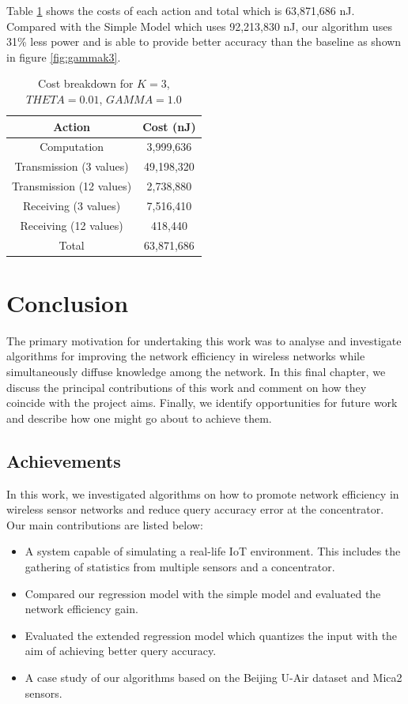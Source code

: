 \documentclass{mproj}
\begin{document}
Table \ref{table:costbreakdown} shows the costs of each action and total which is 63,871,686 nJ. Compared with the Simple Model which uses 92,213,830 nJ, our algorithm uses 31\% less power and is able to provide better accuracy than the baseline as shown in figure \ref{fig:gammak3}.

\begin{table}[!ht]
 \centering
 \begin{tabular}{|| c | c ||}
 \hline
 Action & Cost (nJ)\\
 \hline\hline
 Computation & 3,999,636 \\ 
 \hline
 Transmission (3 values) & 49,198,320 \\
 \hline
 Transmission (12 values) & 2,738,880 \\
 \hline
 Receiving (3 values) & 7,516,410 \\
 \hline
 Receiving (12 values) & 418,440 \\
 \hline
 Total & 63,871,686 \\
 \hline
\end{tabular}
\caption{Cost breakdown for $K=3$, $THETA=0.01$, $GAMMA=1.0$}
 \label{table:costbreakdown} 
\end{table}

\chapter{Conclusion}
The primary motivation for undertaking this work was to analyse and investigate algorithms for improving the network efficiency in wireless networks while simultaneously diffuse knowledge among the network. In this final chapter, we discuss the principal contributions of this work and comment on how they coincide with the project aims. Finally, we identify opportunities for future work and describe how one might go about to achieve them.

\section{Achievements}
In this work, we investigated algorithms on how to promote network efficiency in wireless sensor networks and reduce query accuracy error at the concentrator. Our main contributions are listed below:
\begin{itemize}
\item A system capable of simulating a real-life IoT environment. This includes the gathering of statistics from multiple sensors and a concentrator.
\item Compared our regression model with the simple model and evaluated the network efficiency gain.
\item Evaluated the extended regression model which quantizes the input with the aim of achieving better query accuracy.
\item A case study of our algorithms based on the Beijing U-Air dataset\cite{air-quality-inference-meets-big-data} and Mica2\cite{adaptiveDataForwarding} sensors.
\end{itemize}
\end{document}
